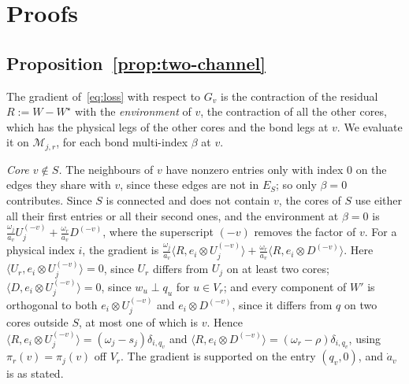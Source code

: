 \documentclass[11pt]{article}
\newcommand{\ip}[2]{\langle #1,#2\rangle}
\theoremstyle{definition}
\numberwithin{equation}{section}
\begin{document}
\section{Proofs}\label{app:proofs}

\subsection{Proposition~\ref{prop:two-channel}}\label{app:two-channel}

The gradient of~\eqref{eq:loss} with respect to $G_v$ is the contraction of the residual $R:=W-W^\star$ with the \emph{environment} of $v$, the contraction of all the other cores, which has the physical legs of the other cores and the bond legs at $v$. We evaluate it on $\mathcal M_{j,r}$, for each bond multi-index $\beta$ at $v$.

\emph{Core $v\notin S$.} The neighbours of $v$ have nonzero entries only with index $0$ on the edges they share with $v$, since these edges are not in $E_S$; so only $\beta=0$ contributes. Since $S$ is connected and does not contain $v$, the cores of $S$ use either all their first entries or all their second ones, and the environment at $\beta=0$ is $\frac{\omega_j}{a_v}U_j^{(-v)}+\frac{\omega_r}{a_v}D^{(-v)}$, where the superscript $(-v)$ removes the factor of $v$. For a physical index $i$, the gradient is $\frac{\omega_j}{a_v}\ip{R}{e_i\otimes U_j^{(-v)}}+\frac{\omega_r}{a_v}\ip{R}{e_i\otimes D^{(-v)}}$. Here $\ip{U_r}{e_i\otimes U_j^{(-v)}}=0$, since $U_r$ differs from $U_j$ on at least two cores; $\ip{D}{e_i\otimes U_j^{(-v)}}=0$, since $w_u\perp q_u$ for $u\in V_r$; and every component of $W'$ is orthogonal to both $e_i\otimes U_j^{(-v)}$ and $e_i\otimes D^{(-v)}$, since it differs from $q$ on two cores outside $S$, at most one of which is $v$. Hence $\ip{R}{e_i\otimes U_j^{(-v)}}=(\omega_j-s_j)\delta_{i,q_v}$ and $\ip{R}{e_i\otimes D^{(-v)}}=(\omega_r-\rho)\delta_{i,q_v}$, using $\pi_r(v)=\pi_j(v)$ off $V_r$. The gradient is supported on the entry $(q_v,0)$, and $\dot a_v$ is as stated.
\end{document}
